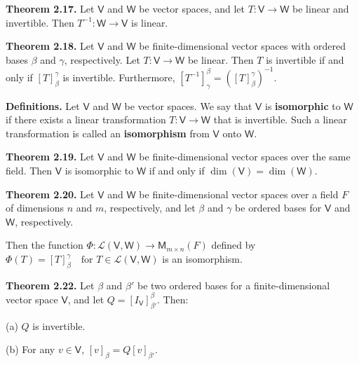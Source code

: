 \documentclass{article}
\newcommand{\0}{\mathit{0}}
\begin{document}
\medskip

\textbf{Theorem 2.17.} Let $\mathsf{V}$ and $\mathsf{W}$ be vector spaces, and let
$T: \mathsf{V} \to \mathsf{W}$ be linear and invertible.
Then $T^{-1}: \mathsf{W} \to \mathsf{V}$ is linear.

\medskip

\textbf{Theorem 2.18.} Let $\mathsf{V}$ and $\mathsf{W}$ be finite-dimensional vector spaces
with ordered bases $\beta$ and $\gamma$, respectively. Let
$T: \mathsf{V} \to \mathsf{W}$ be linear.
Then $T$ is invertible if and only if $\left[ T \right]^\gamma_\beta$ is invertible.
Furthermore,
\(
\left[ T^{-1} \right]^\beta_\gamma = \left( \left[ T \right]^\gamma_\beta \right)^{-1}.
\)

\medskip

\textbf{Definitions.} Let $\mathsf{V}$ and $\mathsf{W}$ be vector spaces.
We say that $\mathsf{V}$ is \textbf{isomorphic} to $\mathsf{W}$ if there exists a linear transformation
$T: \mathsf{V} \to \mathsf{W}$ that is invertible. Such a linear transformation is called an
\textbf{isomorphism} from $\mathsf{V}$ onto $\mathsf{W}$.

\medskip

\textbf{Theorem 2.19.} Let $\mathsf{V}$ and $\mathsf{W}$ be finite-dimensional vector spaces
over the same field. Then $\mathsf{V}$ is isomorphic to $\mathsf{W}$ if and only if
\(
\dim(\mathsf{V}) = \dim(\mathsf{W}).
\)

\medskip

\textbf{Theorem 2.20.} Let $\mathsf{V}$ and $\mathsf{W}$ be finite-dimensional vector spaces
over a field $F$ of dimensions $n$ and $m$, respectively, and let $\beta$ and $\gamma$
be ordered bases for $\mathsf{V}$ and $\mathsf{W}$, respectively.

Then the function
\(
\Phi: \mathcal{L}(\mathsf{V}, \mathsf{W}) \to \mathsf{M}_{m \times n}(F)
\)
defined by
\(
\Phi(T) = \left[ T \right]^\gamma_\beta \quad \text{for } T \in \mathcal{L}(\mathsf{V}, \mathsf{W})
\)
is an isomorphism.

\medskip

\textbf{Theorem 2.22.} Let $\beta$ and $\beta'$ be two ordered bases for a finite-dimensional
vector space $\mathsf{V}$, and let $Q = \left[ I_{\mathsf{V}} \right]^\beta_{\beta'}$. Then:

(a) $Q$ is invertible.

(b) For any $v \in \mathsf{V}$,
\(
\left[ v \right]_\beta = Q \left[ v \right]_{\beta'}.
\)

\medskip
\end{document}
